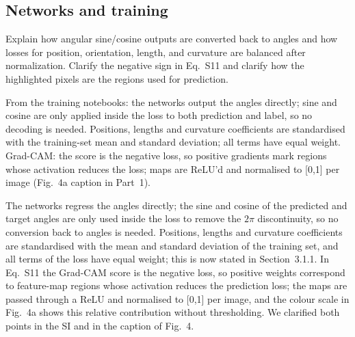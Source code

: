 \documentclass[10pt,a4paper]{article}
\begin{document}
\subsection{Networks and training}\label{sec:nets}
\begin{rev}
Explain how angular sine/cosine outputs are converted back to angles and how losses for position, orientation, length, and curvature are balanced after normalization. Clarify the negative sign in Eq.~S11 and clarify how the highlighted pixels are the regions used for prediction.
\end{rev}
\begin{todo}
From the training notebooks: the networks output the angles directly; sine and cosine are only applied inside the loss to both prediction and label, so no decoding is needed. Positions, lengths and curvature coefficients are standardised with the training-set mean and standard deviation; all terms have equal weight. Grad-CAM: the score is the negative loss, so positive gradients mark regions whose activation reduces the loss; maps are ReLU'd and normalised to [0,1] per image (Fig.~4a caption in Part~1).
\end{todo}
\begin{resp}
The networks regress the angles directly; the sine and cosine of the predicted and target angles are only used inside the loss to remove the $2\pi$ discontinuity, so no conversion back to angles is needed. Positions, lengths and curvature coefficients are standardised with the mean and standard deviation of the training set, and all terms of the loss have equal weight; this is now stated in Section~3.1.1. In Eq.~S11 the Grad-CAM score is the negative loss, so positive weights correspond to feature-map regions whose activation reduces the prediction loss; the maps are passed through a ReLU and normalised to [0,1] per image, and the colour scale in Fig.~4a shows this relative contribution without thresholding. We clarified both points in the SI and in the caption of Fig.~4.
\end{resp}
\end{document}
